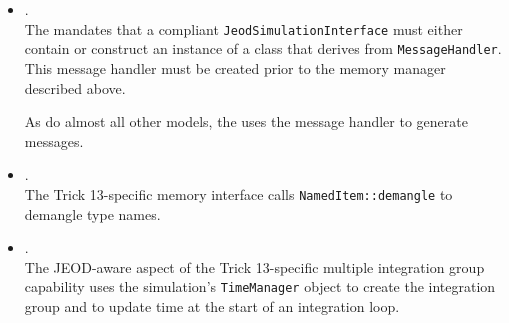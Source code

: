 \begin{itemize}
\item{}.\\
The \ModelDesc  mandates that a compliant \verb|JeodSimulationInterface|
must either contain or construct an instance of a class that derives from
\verb|MessageHandler|. This message handler must be created prior to the
memory manager described above.

As do almost all other models,
the \ModelDesc uses the message handler to generate messages.

\item{}.\\
The Trick 13-specific memory interface calls \verb|NamedItem::demangle| to
demangle type names.

\item{}.\\
The JEOD-aware aspect of the Trick 13-specific multiple integration group
capability uses the simulation's \verb|TimeManager| object to create the
integration group and to update time at the start of an integration loop.
\end{itemize}


